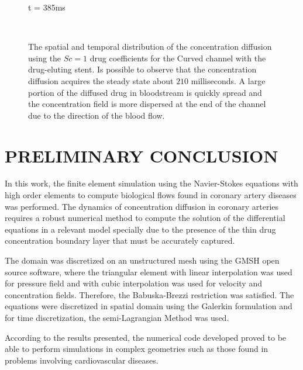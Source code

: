 \documentclass[10pt,fleqn,a4paper,twoside]{article}
\begin{document}
\begin{figure}[H]
\begin{minipage}{.45\linewidth}
      t = 385ms
     \end{minipage}\\[0.3cm]
     \caption{
The spatial and temporal distribution of the concentration diffusion
using the $Sc=1$ 
drug coefficients for
the Curved channel 
with the drug-eluting stent.
Is possible to observe that
the concentration diffusion acquires the steady state about
$210$ milliseconds. 
A large portion of
the diffused drug in bloodstream is quickly spread and
the concentration field is more dispersed at the end
of the channel due to the direction of the blood flow.
}\label{concentration}
\end{figure}





\section{PRELIMINARY CONCLUSION}
In this work, the finite element simulation using 
the Navier-Stokes equations with high 
order elements to compute biological flows found 
in coronary artery diseases
was performed. The dynamics of concentration 
diffusion in coronary arteries requires a
robust numerical method to compute the solution 
of the differential equations in a relevant
model specially due to the presence of the thin 
drug concentration boundary layer that
must be accurately captured. 

\smallskip
The domain was discretized on an unstructured 
mesh using the GMSH
open source software, where the triangular element 
with linear interpolation was used for pressure field and with cubic
interpolation was used for velocity and concentration fields.
Therefore, the Babuska-Brezzi restriction was satisfied.
The equations were discretized in spatial domain 
using the Galerkin formulation and 
for time discretization, the semi-Lagrangian Method was used.

\smallskip
According to the 
results presented, 
the numerical code developed proved 
to be able to perform simulations in
complex geometries such as those found in problems 
involving cardiovascular diseases.

\smallskip
\end{document}
